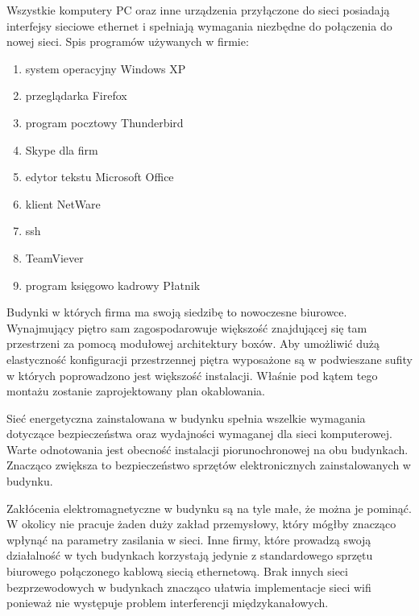 \documentclass{report}
\begin{document}
Wszystkie komputery PC oraz inne urządzenia przyłączone do sieci posiadają interfejsy sieciowe ethernet i spełniają wymagania niezbędne
do połączenia do nowej sieci. Spis programów używanych w firmie:
\begin{enumerate}
 \item system operacyjny Windows XP
 \item przeglądarka Firefox
 \item program pocztowy Thunderbird
 \item Skype dla firm
 \item edytor tekstu Microsoft Office
 \item klient NetWare
 \item ssh
 \item TeamViever
 \item program księgowo kadrowy Płatnik
\end{enumerate}

Budynki w których firma ma swoją siedzibę to nowoczesne biurowce. Wynajmujący piętro sam zagospodarowuje większość 
znajdującej się tam przestrzeni za pomocą modułowej architektury boxów. Aby umożliwić dużą elastyczność konfiguracji przestrzennej piętra 
wyposażone są w podwieszane sufity w których poprowadzono jest większość instalacji. Właśnie pod kątem tego montażu zostanie zaprojektowany plan
okablowania.

Sieć energetyczna zainstalowana w budynku spełnia wszelkie wymagania dotyczące bezpieczeństwa oraz wydajności wymaganej dla sieci komputerowej.
Warte odnotowania jest obecność instalacji piorunochronowej na obu budynkach. Znacząco zwiększa to bezpieczeństwo sprzętów elektronicznych zainstalowanych
w budynku.

Zakłócenia elektromagnetyczne w budynku są na tyle małe, że można je pominąć. W okolicy nie pracuje żaden duży zakład przemysłowy, który mógłby 
znacząco wpłynąć na parametry zasilania w sieci. Inne firmy, które prowadzą swoją działalność w tych budynkach korzystają jedynie z standardowego
sprzętu biurowego połączonego kablową siecią ethernetową. Brak innych sieci bezprzewodowych w budynkach znacząco ułatwia implementacje sieci wifi
ponieważ nie występuje problem interferencji międzykanałowych.

\pagebreak[4]
\end{document}
